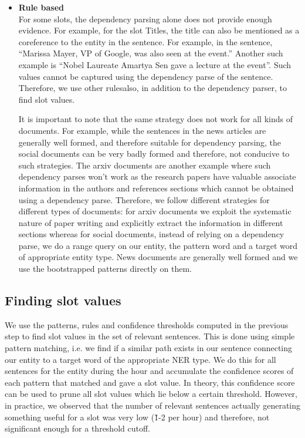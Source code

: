 \begin{itemize}[label={}]
\item \textbf{Rule based}\\
For some slots, the dependency parsing alone does not provide enough evidence. For example, for the slot Titles, the title can also be mentioned as a coreference to the entity in the sentence. For example, in the sentence, “Marissa Mayer, VP of Google, was also seen at the event.” Another such example is “Nobel Laureate Amartya Sen gave a lecture at the event”. Such values cannot be captured using the dependency parse of the sentence. Therefore, we use other rulesalso, in addition to the dependency parser, to find slot values.

It is important to note that the same strategy does not work for all kinds of documents. For example, while the sentences in the news articles are generally well formed, and therefore suitable for dependency parsing, the social documents can be very badly formed and therefore, not conducive to such strategies. The arxiv documents are another example where such dependency parses won’t work as the research papers have valuable associate information in the authors and references sections which cannot be obtained using a dependency parse. Therefore, we follow different strategies for different types of documents: for arxiv documents we exploit the systematic nature of paper writing and explicitly extract the information in different sections whereas for social documents, instead of relying on a dependency parse, we do a range query on our entity, the pattern word and a target word of appropriate entity type. News documents are generally well formed and we use the bootstrapped patterns directly on them.
\end{itemize}

\subsection{Finding slot values}
We use the patterns, rules and confidence thresholds computed in the previous step to find slot values in the set of relevant sentences. This is done using simple pattern matching, i.e. we find if a similar path exists in our sentence connecting our entity to a target word of the appropriate NER type. We do this for all sentences for the entity during the hour and accumulate the confidence scores of each pattern that matched and gave a slot value. In theory, this confidence score can be used to prune all slot values which lie below a certain threshold. However, in practice, we observed that the number of relevant sentences actually generating something useful for a slot was very low (\~1-2 per hour) and therefore, not significant enough for a threshold cutoff.

